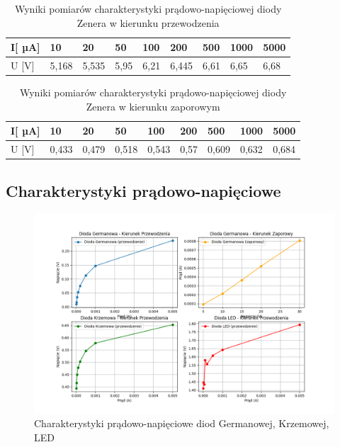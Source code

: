 \documentclass[10pt]{article}
\begin{document}
\begin{table}[!ht]
    \centering
    \caption{Wyniki pomiarów charakterystyki prądowo-napięciowej diody Zenera w kierunku przewodzenia}
    \begin{tabular}{|l|l|l|l|l|l|l|l|l|}
    \hline
        I[ µA] & 10 & 20 & 50 & 100 & 200 & 500 & 1000 & 5000 \\ \hline
        U [V] & 5,168 & 5,535 & 5,95 & 6,21 & 6,445 & 6,61 & 6,65 & 6,68 \\ \hline
    \end{tabular}
\end{table}
\begin{table}[!ht]
    \centering
    \caption{Wyniki pomiarów charakterystyki prądowo-napięciowej diody Zenera w kierunku zaporowym}
    \begin{tabular}{|l|l|l|l|l|l|l|l|l|}
    \hline
        I[ µA] & 10 & 20 & 50 & 100 & 200 & 500 & 1000 & 5000 \\ \hline
        U [V] & 0,433 & 0,479 & 0,518 & 0,543 & 0,57 & 0,609 & 0,632 & 0,684 \\ \hline
    \end{tabular}
\end{table}
\clearpage
\subsection*{Charakterystyki prądowo-napięciowe}

\begin{figure}[H]
    \centering
    \includegraphics[width=1.0\textwidth]{Figure_1.png}
    \caption{Charakterystyki prądowo-napięciowe diod Germanowej, Krzemowej, LED}
    \label{fig:charakterystyki_przewodzenie}
\end{figure}
\end{document}
